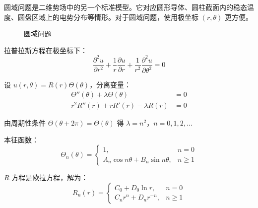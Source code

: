 圆域问题是二维势场中的另一个标准模型。它对应圆形导体、圆柱截面内的稳态温度、圆盘区域上的电势分布等情形。对于圆域问题，使用极坐标 $(r, \theta)$ 更方便。

\begin{figure}[htbp]
\centering
{}
\caption{圆域问题}
\label{fig:circular-domain}
\end{figure}

拉普拉斯方程在极坐标下：
\begin{equation}
    \frac{\partial^2 u}{\partial r^2} + \frac{1}{r}\frac{\partial u}{\partial r} + \frac{1}{r^2}\frac{\partial^2 u}{\partial \theta^2} = 0
\end{equation}

设 $u(r, \theta) = R(r)\Theta(\theta)$，分离变量：
\begin{align}
    \Theta''(\theta) + \lambda\Theta(\theta) &= 0 \\
    r^2R''(r) + rR'(r) - \lambda R(r) &= 0
\end{align}

由周期性条件 $\Theta(\theta + 2\pi) = \Theta(\theta)$ 得 $\lambda = n^2$，$n = 0, 1, 2, \ldots$

本征函数：
\begin{equation}
    \Theta_n(\theta) = \begin{cases}
        1, & n = 0 \\
        A_n\cos n\theta + B_n\sin n\theta, & n \geq 1
    \end{cases}
\end{equation}

$R$ 方程是欧拉方程，解为：
\begin{equation}
    R_n(r) = \begin{cases}
        C_0 + D_0\ln r, & n = 0 \\
        C_n r^n + D_n r^{-n}, & n \geq 1
    \end{cases}
\end{equation}

